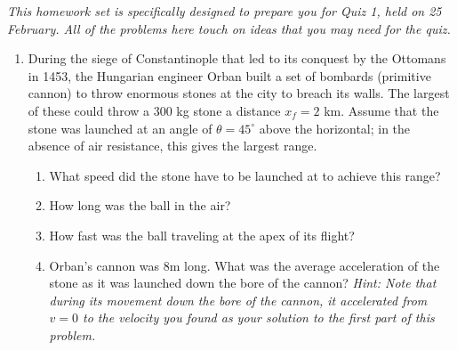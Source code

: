 \documentclass[12pt]{article}
\begin{document}
\Large
\centerline{}
\normalsize

\it This homework set is specifically designed to prepare you for Quiz 1, held on 25 February. All of the problems here touch on ideas that you may need for the quiz.
\rm
\begin{enumerate}

%
%
%
%
%

\item During the siege of Constantinople that led to its conquest by the Ottomans in 1453, the Hungarian engineer Orban built a set of bombards (primitive cannon) to throw enormous stones at the city to breach its walls. The largest of these could throw a 300 kg stone a distance $x_f=2$ km. Assume that the stone was launched at an angle of $\theta=45^\circ$ above the horizontal; in the absence of air resistance, this gives the largest range.

\begin{enumerate}

\item What speed did the stone have to be launched at to achieve this range?
\item How long was the ball in the air?
\item How fast was the ball traveling at the apex of its flight?
\item Orban's cannon was 8m long. What was the average acceleration of the stone as it was launched down the bore of the cannon? {\it Hint: Note that during its movement down the bore of the cannon, it accelerated from $v=0$ to the velocity you found as your solution to the first part of this problem.}
\end{enumerate}


\end{enumerate}
\end{document}
